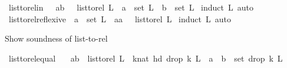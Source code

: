 \begin{isabellebody}
{\isafoldproof}%
%
\isadelimproof
\isanewline
%
\endisadelimproof
\isanewline
{}\isamarkupfalse%
\ list{\isacharunderscore}{\kern0pt}to{\isacharunderscore}{\kern0pt}rel{\isacharunderscore}{\kern0pt}in\ {\isacharcolon}{\kern0pt}\ {\isachardoublequoteopen}\ {\isacharparenleft}{\kern0pt}a{\isacharcomma}{\kern0pt}b{\isacharparenright}{\kern0pt}\ \ {\isasymin}\ {\isacharparenleft}{\kern0pt}list{\isacharunderscore}{\kern0pt}to{\isacharunderscore}{\kern0pt}rel\ L{\isacharparenright}{\kern0pt}\ {\isasymLongrightarrow}\ a\ {\isasymin}\ set\ L\ {\isasymand}\ b\ {\isasymin}\ set\ L{\isachardoublequoteclose}\ \isanewline
%
\isadelimproof
%
\endisadelimproof
%
\isatagproof
{}\isamarkupfalse%
{\isacharparenleft}{\kern0pt}induct\ L{\isacharcomma}{\kern0pt}\ auto{\isacharparenright}{\kern0pt}\ \isamarkupfalse%
%
\endisatagproof
{\isafoldproof}%
%
\isadelimproof
\isanewline
%
\endisadelimproof
\isanewline
\isanewline
\isanewline
{}\isamarkupfalse%
\ list{\isacharunderscore}{\kern0pt}to{\isacharunderscore}{\kern0pt}rel{\isacharunderscore}{\kern0pt}reflexive\ {\isacharcolon}{\kern0pt}\ {\isachardoublequoteopen}a\ {\isasymin}\ set\ L\ {\isasymLongrightarrow}\ {\isacharparenleft}{\kern0pt}a{\isacharcomma}{\kern0pt}a{\isacharparenright}{\kern0pt}\ \ {\isasymin}\ {\isacharparenleft}{\kern0pt}list{\isacharunderscore}{\kern0pt}to{\isacharunderscore}{\kern0pt}rel\ L{\isacharparenright}{\kern0pt}{\isachardoublequoteclose}\ \isanewline
%
\isadelimproof
%
\endisadelimproof
%
\isatagproof
{}\isamarkupfalse%
{\isacharparenleft}{\kern0pt}induct\ L{\isacharcomma}{\kern0pt}\ auto{\isacharparenright}{\kern0pt}\ \isamarkupfalse%
%
\endisatagproof
{\isafoldproof}%
%
\isadelimproof
%
\endisadelimproof
%
\begin{isamarkuptext}%
Show soundness of list-to-rel%
\end{isamarkuptext}\isamarkuptrue%
\isamarkupfalse%
\ list{\isacharunderscore}{\kern0pt}to{\isacharunderscore}{\kern0pt}rel{\isacharunderscore}{\kern0pt}equal{\isacharcolon}{\kern0pt}\ \isanewline
\ \ {\isachardoublequoteopen}{\isacharparenleft}{\kern0pt}a{\isacharcomma}{\kern0pt}b{\isacharparenright}{\kern0pt}\ {\isasymin}\ list{\isacharunderscore}{\kern0pt}to{\isacharunderscore}{\kern0pt}rel\ L\ {\isasymlongleftrightarrow}\ {\isacharparenleft}{\kern0pt}{\isasymexists}k{\isacharcolon}{\kern0pt}{\isacharcolon}{\kern0pt}nat{\isachardot}{\kern0pt}\ hd\ {\isacharparenleft}{\kern0pt}drop\ k\ L{\isacharparenright}{\kern0pt}\ {\isacharequal}{\kern0pt}\ a\ {\isasymand}\ b\ {\isasymin}\ set\ {\isacharparenleft}{\kern0pt}drop\ k\ L{\isacharparenright}{\kern0pt}{\isacharparenright}{\kern0pt}{\isachardoublequoteclose}\isanewline

\end{isabellebody}
